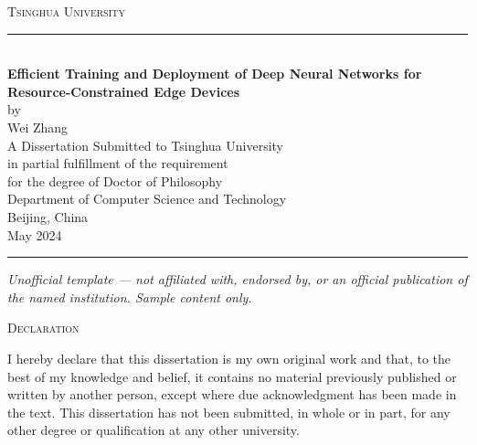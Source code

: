 \documentclass[12pt,a4paper,oneside]{book}
\newcommand{\tsinghuatitle}{Efficient Training and Deployment of Deep Neural
Networks for Resource-Constrained Edge Devices}
\newcommand{\tsinghuaauthor}{Wei Zhang}
\newcommand{\tsinghuadept}{Department of Computer Science and Technology}
\newcommand{\tsinghuadate}{May 2024}
\begin{document}
\frontmatter

\begin{titlepage}
\thispagestyle{empty}
\begin{center}

\vspace*{30mm}

{\LARGE\scshape\color{tsinghuapurple}Tsinghua University}\\[8mm]

{\color{tsinghuapurple}\rule{0.45\textwidth}{0.8pt}}\\[20mm]

{\LARGE\bfseries\tsinghuatitle}\\[25mm]

{\large by}\\[6mm]

{\Large\tsinghuaauthor}\\[30mm]

{\large A Dissertation Submitted to Tsinghua University\\
in partial fulfillment of the requirement\\
for the degree of Doctor of Philosophy}\\[20mm]

{\large\tsinghuadept}\\[4mm]
{\large Beijing, China}\\[4mm]
{\large\tsinghuadate}

\vfill

{\color{tsinghuapurple}\rule{0.45\textwidth}{0.8pt}}

\vfill
{\footnotesize\itshape Unofficial template --- not affiliated with, endorsed by, or an official publication of the named institution. Sample content only.}
\end{center}
\end{titlepage}

\thispagestyle{empty}
\vspace*{40mm}

\begin{center}
{\LARGE\scshape\color{tsinghuapurple}Declaration}
\end{center}

\vspace{20mm}

I hereby declare that this dissertation is my own original work and that,
to the best of my knowledge and belief, it contains no material previously
published or written by another person, except where due acknowledgment
has been made in the text. This dissertation has not been submitted, in
whole or in part, for any other degree or qualification at any other
university.
\end{document}
